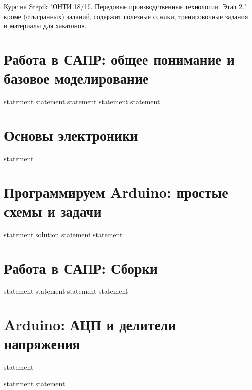 Курс на Stepik "ОНТИ 18/19. Передовые производственные технологии. Этап 2." кроме (отыгранных) заданий, содержит полезные ссылки, тренировочные задания и материалы для хакатонов. 

\section{Работа в САПР: общее понимание и базовое моделирование}

{statement}
{statement}
{statement}
{statement}
{statement}

\section{Основы электроники}

{statement}

\section{Программируем Arduino: простые схемы и задачи}

{statement}
{solution}
{statement}
{statement}

\section{Работа в САПР: Сборки}

{statement}
{statement}
{statement}
{statement}

\section{Arduino: АЦП и делители напряжения}

{statement}

{statement}
{statement}

